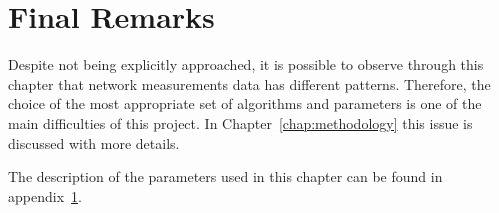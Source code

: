 \section{Final Remarks}

Despite not being explicitly approached, it is possible to observe
through this chapter
that network measurements data has different patterns. Therefore,
the choice of the most appropriate set of algorithms and parameters
is one of the main difficulties of this project.
In Chapter~\ref{chap:methodology} this issue is discussed with more details.

The description of the parameters used in this
chapter can be found in appendix~\ref{}.
